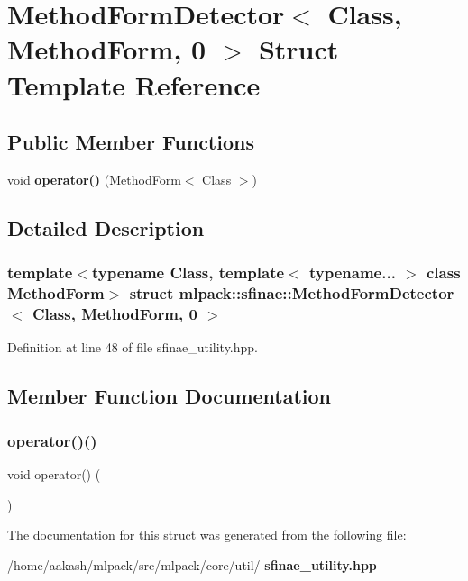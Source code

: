 \section{Method\+Form\+Detector$<$ Class, Method\+Form, 0 $>$ Struct Template Reference}
\label{structmlpack_1_1sfinae_1_1MethodFormDetector_3_01Class_00_01MethodForm_00_010_01_4}
\subsection*{Public Member Functions}
\begin{DoxyCompactItemize}
\item 
void \textbf{ operator()} (Method\+Form$<$ Class $>$)
\end{DoxyCompactItemize}


\subsection{Detailed Description}
\subsubsection*{template$<$typename Class, template$<$ typename... $>$ class Method\+Form$>$\newline
struct mlpack\+::sfinae\+::\+Method\+Form\+Detector$<$ Class, Method\+Form, 0 $>$}



Definition at line 48 of file sfinae\+\_\+utility.\+hpp.



\subsection{Member Function Documentation}
\mbox{\label{structmlpack_1_1sfinae_1_1MethodFormDetector_3_01Class_00_01MethodForm_00_010_01_4_a82bf0097169a41bf41c1590cba915c97}} 
\subsubsection{operator()()}
{\footnotesize\ttfamily void operator() (\begin{DoxyParamCaption}\item[{Method\+Form$<$ Class $>$}]{ }\end{DoxyParamCaption})}



The documentation for this struct was generated from the following file\+:\begin{DoxyCompactItemize}
\item 
/home/aakash/mlpack/src/mlpack/core/util/\textbf{ sfinae\+\_\+utility.\+hpp}\end{DoxyCompactItemize}
